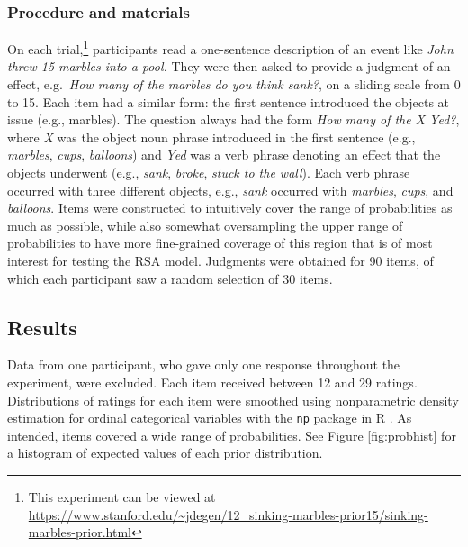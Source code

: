 \documentclass[10pt,letterpaper]{article}
\newcommand{\red}[1]{\textcolor{Red}{#1}}
\newcommand{\figref}[1]{Figure \ref{#1}}
\begin{document}
\subsubsection{Procedure and materials}

On each trial,\footnote{This experiment can be viewed at \url{https://www.stanford.edu/~jdegen/12_sinking-marbles-prior15/sinking-marbles-prior.html}} participants read a one-sentence description of an event like \emph{John threw 15 marbles into a pool.} They were then asked to provide a judgment of an effect, e.g.~\emph{How many of the marbles do you think sank?}, on a sliding scale from 0 to 15. Each item had a similar form: the first sentence introduced the objects at issue (e.g., marbles). The question always had the form \emph{How many of the X Yed?}, where \emph{X} was the object noun phrase introduced in the first sentence (e.g., \emph{marbles}, \emph{cups}, \emph{balloons}) and \emph{Yed} was a verb phrase denoting an effect that the objects underwent (e.g., \emph{sank}, \emph{broke}, \emph{stuck to the wall}). Each verb phrase occurred with three different objects, e.g., \emph{sank} occurred with \emph{marbles}, \emph{cups}, and \emph{balloons}. Items were constructed to intuitively cover the range of probabilities as much as possible, while also somewhat oversampling the upper range of probabilities to have more fine-grained coverage of this region that is of most interest for testing the RSA model. Judgments were obtained for 90 items, of which each participant saw a random selection of 30 items. 

\subsection{Results}

Data from one participant, who gave only one response throughout the experiment, were excluded. Each item received between 12 and 29 ratings. Distributions of ratings for each item were smoothed using nonparametric density estimation for ordinal categorical variables \cite{liracine2003} with the \verb|np| package in R \cite{hayfield2008}. As intended, items covered a wide range of probabilities. See \figref{fig:probhist} for a histogram of expected values of each prior distribution.
\end{document}
